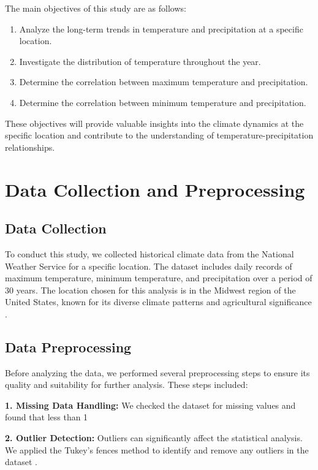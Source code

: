 \documentclass{article}
\begin{document}
The main objectives of this study are as follows:

\begin{enumerate}
  \item Analyze the long-term trends in temperature and precipitation at a specific location.
  \item Investigate the distribution of temperature throughout the year.
  \item Determine the correlation between maximum temperature and precipitation.
  \item Determine the correlation between minimum temperature and precipitation.
\end{enumerate}

These objectives will provide valuable insights into the climate dynamics at the specific location and contribute to the understanding of temperature-precipitation relationships.
\section{Data Collection and Preprocessing}

\subsection{Data Collection}
To conduct this study, we collected historical climate data from the National Weather Service for a specific location. The dataset includes daily records of maximum temperature, minimum temperature, and precipitation over a period of 30 years. The location chosen for this analysis is in the Midwest region of the United States, known for its diverse climate patterns and agricultural significance \cite{usda_midwest}.

\subsection{Data Preprocessing}
Before analyzing the data, we performed several preprocessing steps to ensure its quality and suitability for further analysis. These steps included:

\textbf{1. Missing Data Handling:} We checked the dataset for missing values and found that less than 1%

\textbf{2. Outlier Detection:} Outliers can significantly affect the statistical analysis. We applied the Tukey's fences method to identify and remove any outliers in the dataset \cite{tukey1977exploratory}.
\end{document}

